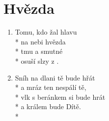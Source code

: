 \section{Hvězda}
\begin{enumerate}
\item {}Tomu, kdo  žal hlavu  \\*
 na nebi hvězda  \\*
 tmu a smutné  \\*
 osuší slzy z .
\item Sníh na dlani tě bude hřát\\*
a mráz ten nespálí tě,\\*
vlk s beránkem si bude hrát\\*
a králem bude Dítě.\\*
\end{enumerate}
